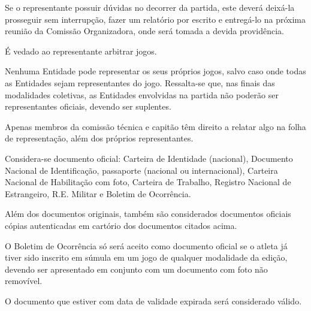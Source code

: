 \begin{article}
	Se o representante possuir dúvidas no decorrer da partida, este deverá deixá-la prosseguir sem interrupção, fazer um relatório por escrito e entregá-lo na próxima reunião da Comissão Organizadora, onde será tomada a devida providência.
\end{article}

\begin{article}
	É vedado ao representante arbitrar jogos.
\end{article}

\begin{article}
	Nenhuma Entidade pode representar os seus próprios jogos, salvo caso onde todas as Entidades sejam representantes do jogo. Ressalta-se que, nas finais das modalidades coletivas, as Entidades envolvidas na partida não poderão ser representantes oficiais, devendo ser suplentes.
\end{article}

\begin{article}
	Apenas membros da comissão técnica e capitão têm direito a relatar algo na folha de representação, além dos próprios representantes.
\end{article}

\begin{article}
    \label{art:documentosoficiais}
	Considera-se documento oficial: Carteira de Identidade (nacional), Documento Nacional de Identificação, passaporte (nacional ou internacional), Carteira Nacional de Habilitação com foto, Carteira de Trabalho, Registro Nacional de Estrangeiro, R.E. Militar e Boletim de Ocorrência.

	\begin{xparagraph}
	    Além dos documentos originais, também são considerados documentos oficiais cópias autenticadas em cartório dos documentos citados acima.
	\end{xparagraph}

	\begin{xparagraph}
	    O Boletim de Ocorrência só será aceito como documento oficial se o atleta já tiver sido inscrito em súmula em um jogo de qualquer modalidade da edição, devendo ser apresentado em conjunto com um documento com foto não removível.
	\end{xparagraph}

	\begin{xparagraph}
	    O documento que estiver com data de validade expirada será considerado válido.
	\end{xparagraph}
\end{article}